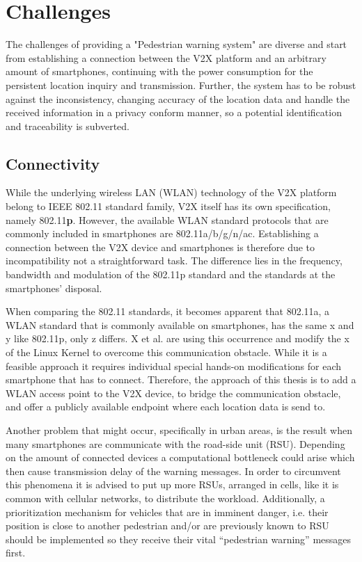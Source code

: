 \newpage

\section{Challenges}
The challenges of providing a "Pedestrian warning system" are diverse and start from establishing a connection between the V2X platform and an arbitrary amount of smartphones, continuing with the power consumption for the persistent location inquiry and transmission.
Further, the system has to be robust against the inconsistency, changing accuracy of the location data and handle the received information in a privacy conform manner, so a potential identification and traceability is subverted.

\subsection{Connectivity}
While the underlying wireless LAN (WLAN) technology of the V2X platform belong to IEEE 802.11 standard family, V2X itself has its own specification, namely 802.11\textbf{p}. However, the available WLAN standard protocols that are commonly included in smartphones are 802.11a/b/g/n/ac. Establishing a connection between the V2X device and smartphones is therefore due to incompatibility not a straightforward task. The difference lies in the frequency, bandwidth and modulation of the 802.11p standard and the standards at the smartphones' disposal.

When comparing the 802.11 standards, it becomes apparent that 802.11a, a WLAN standard that is commonly available on smartphones, has the same x and y like 802.11p, only z differs. X et al. \cite{} are using this occurrence and modify the {x} of the Linux Kernel to overcome this communication obstacle. While it is a feasible approach it requires individual special hands-on modifications for each smartphone that has to connect.
Therefore, the approach of this thesis is to add a WLAN access point to the V2X device, to bridge the communication obstacle, and offer a publicly available endpoint where each location data is send to.

Another problem that might occur, specifically in urban areas, is the result when many smartphones are communicate with the road-side unit (RSU). Depending on the amount of connected devices a computational bottleneck could arise which then cause transmission delay of the warning messages.
In order to circumvent this phenomena it is advised to put up more RSUs, arranged in cells, like it is common with cellular networks, to distribute the workload. Additionally, a prioritization mechanism for vehicles that are in imminent danger, i.e. their position is close to another pedestrian and/or are previously known to RSU should be implemented so they receive their vital ``pedestrian warning'' messages first.


